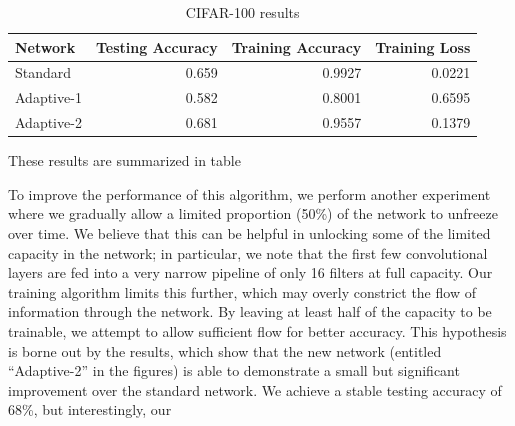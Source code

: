 \begin{table}[!htb]
\centering
\caption{CIFAR-100 results}
\label{table:cifar}
\begin{tabular}{@{}lrrr@{}}
\toprule
Network    & Testing Accuracy & Training Accuracy & Training Loss \\ \midrule
Standard   & 0.659            & 0.9927            & 0.0221        \\
Adaptive-1 & 0.582            & 0.8001            & 0.6595        \\
Adaptive-2 & 0.681            & 0.9557            & 0.1379        \\ \bottomrule
\end{tabular}
\end{table}


These results are summarized in table

To improve the performance of this algorithm, we perform another experiment where we gradually allow a limited proportion (50\%) of the network to unfreeze over time.
We believe that this can be helpful in unlocking some of the limited capacity in the network; in particular, we note that the first few convolutional layers are fed into a very narrow pipeline of only 16 filters at full capacity.
Our training algorithm limits this further, which may overly constrict the flow of information through the network.
By leaving at least half of the capacity to be trainable, we attempt to allow sufficient flow for better accuracy.
This hypothesis is borne out by the results, which show that the new network (entitled ``Adaptive-2'' in the figures) is able to demonstrate a small but significant improvement over the standard network.
We achieve a stable testing accuracy of 68\%, but interestingly, our 




